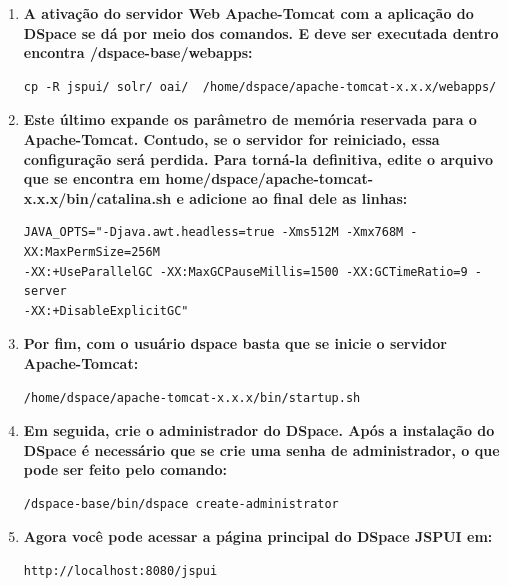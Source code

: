 \documentclass[12pt,hidelinks]{article}
\begin{document}
\begin{enumerate}
        
        \item \textbf{A ativação do servidor Web Apache-Tomcat com a aplicação do DSpace se dá por meio dos comandos. E deve ser executada dentro encontra /dspace-base/webapps:}\\
            
         \begin{verbatim}
cp -R jspui/ solr/ oai/  /home/dspace/apache-tomcat-x.x.x/webapps/
         \end{verbatim}
         
          \item \textbf{Este último expande os parâmetro de memória reservada para o Apache-Tomcat. Contudo, se o servidor for reiniciado, essa configuração será perdida. Para torná-la definitiva, edite o arquivo que se encontra em home/dspace/apache-tomcat-x.x.x/bin/catalina.sh e adicione ao final dele as linhas:}\\
          
            \begin{verbatim}
JAVA_OPTS="-Djava.awt.headless=true -Xms512M -Xmx768M -XX:MaxPermSize=256M 
-XX:+UseParallelGC -XX:MaxGCPauseMillis=1500 -XX:GCTimeRatio=9 -server
-XX:+DisableExplicitGC"
            \end{verbatim}
         
         \item \textbf{Por fim, com o usuário dspace basta que se inicie o servidor Apache-Tomcat:}\\

            \begin{verbatim}
/home/dspace/apache-tomcat-x.x.x/bin/startup.sh
            \end{verbatim}
            
        \item \textbf{Em seguida, crie o administrador do DSpace. Após a instalação do DSpace é necessário que se crie uma senha de administrador, o que pode ser feito pelo comando:}\\
        
            \begin{verbatim}
/dspace-base/bin/dspace create-administrator
            \end{verbatim}
            
        \item \textbf{Agora você pode acessar a página principal do DSpace JSPUI em:}\\
        
        \begin{verbatim}
http://localhost:8080/jspui
            \end{verbatim}

\end{enumerate}
\end{document}
